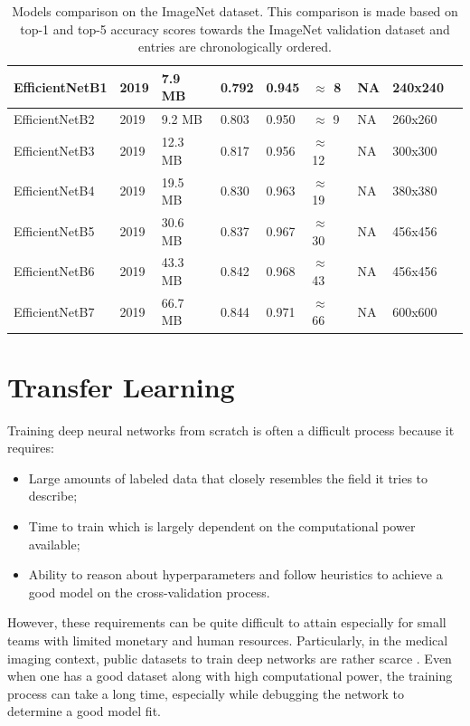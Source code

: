\begin{table}[h]
\begin{tabularx}{\textwidth}{|l|X|X|X|X|X|X|X|X|}
            EfficientNetB1 \cite{efficientnet} & 2019 & 7.9 MB & 0.792 & 0.945 & $\approx$ 8 & NA & 240x240 \\ \hline
            EfficientNetB2 \cite{efficientnet} & 2019 & 9.2 MB & 0.803 & 0.950 & $\approx$ 9 & NA & 260x260 \\ \hline
            EfficientNetB3 \cite{efficientnet} & 2019 & 12.3 MB & 0.817 & 0.956 & $\approx$ 12 & NA & 300x300 \\ \hline
            EfficientNetB4 \cite{efficientnet} & 2019 & 19.5 MB & 0.830 & 0.963 & $\approx$ 19 & NA & 380x380 \\ \hline
            EfficientNetB5 \cite{efficientnet} & 2019 & 30.6 MB & 0.837 & 0.967 & $\approx$ 30 & NA & 456x456 \\ \hline
            EfficientNetB6 \cite{efficientnet} & 2019 & 43.3 MB & 0.842 & 0.968 & $\approx$ 43 & NA &456x456 \\ \hline
            EfficientNetB7 \cite{efficientnet} & 2019 & 66.7 MB & 0.844 & 0.971 & $\approx$ 66 & NA &600x600 \\ \hline
        \end{tabularx}
        \caption[Models comparison on the ImageNet dataset.]{Models comparison on the ImageNet dataset. This comparison is made based on top-1 and top-5 accuracy scores towards the ImageNet validation dataset and entries are chronologically ordered.}
        \label{tables:pretrainedmodels}
    \end{table} 


\section{Transfer Learning}
\label{section:mam_transfer_learning}
    Training deep neural networks from scratch is often a difficult process because it requires:
    \begin{itemize}
        \item Large amounts of labeled data that closely resembles the field it tries to describe; 
        \item Time to train which is largely dependent on the computational power available;
        \item Ability to reason about hyperparameters and follow heuristics to achieve a good model on the cross-validation process.
    \end{itemize}
    
    However, these requirements can be quite difficult to attain especially for small teams with limited monetary and human resources. Particularly, in the medical imaging context, public datasets to train deep networks are rather scarce \cite{Miotto2017}. Even when one has a good dataset along with high computational power, the training process can take a long time, especially while debugging the network to determine a good model fit. \par
    
